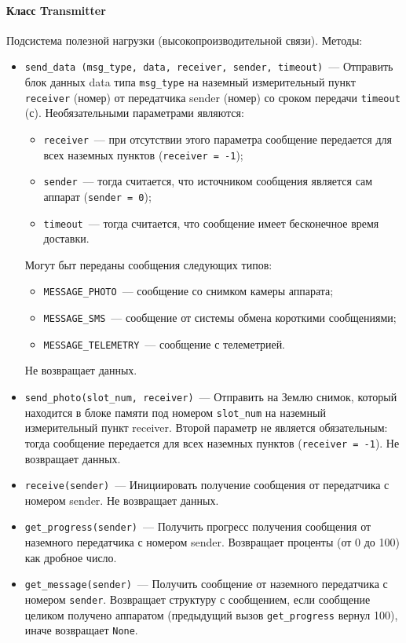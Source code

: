 \documentclass[12pt,a4paper]{article}
\begin{document}
\paragraph{Класс Transmitter}

Подсистема полезной нагрузки (высокопроизводительной связи). Методы:

\begin{itemize}
\item \verb'send_data (msg_type, data, receiver, sender, timeout)'~--- Отправить блок
  данных data типа \verb'msg_type' на наземный измерительный пункт \verb'receiver' (номер)
  от передатчика sender (номер) со сроком передачи \verb'timeout' (с). Необязательными
  параметрами являются:

\begin{itemize}
\item \verb'receiver'~---  при отсутствии этого параметра сообщение передается для всех наземных пунктов (\verb'receiver = -1');
\item \verb'sender'~---  тогда считается, что источником сообщения является сам аппарат (\verb'sender = 0');
\item \verb'timeout'~---  тогда считается, что сообщение имеет бесконечное время доставки.
\end{itemize}

    Могут быт переданы сообщения следующих типов:

\begin{itemize}
\item \verb'MESSAGE_PHOTO'~---  сообщение со снимком камеры аппарата;
\item \verb'MESSAGE_SMS'~---  сообщение от системы обмена короткими сообщениями;
\item \verb'MESSAGE_TELEMETRY'~---  сообщение с телеметрией.
\end{itemize}
    
Не возвращает данных.
\item \verb'send_photo(slot_num, receiver)'~--- Отправить на Землю снимок, который
  находится в блоке памяти под номером \verb'slot_num' на наземный измерительный пункт
  receiver. Второй параметр не является обязательным: тогда сообщение передается для всех
  наземных пунктов (\verb'receiver = -1'). Не возвращает данных.
\item \verb'receive(sender)'~--- Инициировать получение сообщения от передатчика с номером
  sender. Не возвращает данных.
\item \verb'get_progress(sender)'~--- Получить прогресс получения сообщения от наземного
  передатчика с номером sender. Возвращает проценты (от 0 до 100) как дробное число.
\item \verb'get_message(sender)'~--- Получить сообщение от наземного передатчика с номером
  \verb'sender'. Возвращает структуру с сообщением, если сообщение целиком получено
  аппаратом (предыдущий вызов \verb'get_progress' вернул 100), иначе возвращает
  \verb'None'.
\end{itemize}
\end{document}
